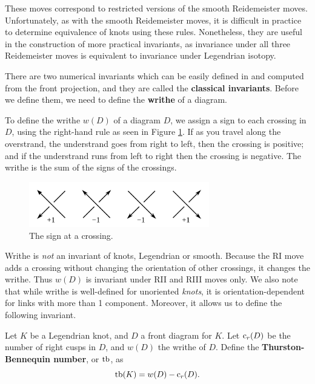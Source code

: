 These moves correspond to restricted versions of the smooth Reidemeister moves.
Unfortunately, as with the smooth Reidemeister moves, it is difficult in practice to determine equivalence of knots using these rules. Nonetheless, they are useful in the construction of more practical invariants, as invariance under all three Reidemeister moves is equivalent to invariance under Legendrian isotopy.


There are two numerical invariants which can be easily defined in and computed from the front projection, and they are called the \textbf{classical invariants}. Before we define them, we need to define the \textbf{writhe} of a diagram.

To define the writhe $w(D)$ of a diagram $D$, we assign a sign to each crossing in $D$, using the right-hand rule as seen in Figure \ref{fig:writhe}. If as you travel along the overstrand, the understrand goes from right to left, then the crossing is positive; and if the understrand runs from left to right then the crossing is negative. 
The writhe is the sum of the signs of the crossings.

\begin{figure}[ht]
    \centering
    \includegraphics[width=0.7\textwidth]{images/writhe.pdf}
    \caption{The sign at a crossing.}
    \label{fig:writhe}
\end{figure}

Writhe is \emph{not} an invariant of knots, Legendrian or smooth. Because the RI move adds a crossing without changing the orientation of other crossings, it changes the writhe. Thus $w(D)$ is invariant under RII and RIII moves only. We also note that while writhe is well-defined for unoriented \emph{knots}, it is orientation-dependent for links with more than 1 component. Moreover, it allows us to define the following invariant.

\begin{definition}
    Let $K$ be a Legendrian knot, and $D$ a front diagram for $K$. Let $\operatorname{c}_r(D)$ be the number of right cusps in $D$, and $w(D)$ the writhe of $D$.
    Define the \textbf{Thurston-Bennequin number}, or $\operatorname{tb}$, as
    \[
        \operatorname{tb}(K) = w(D) - \operatorname{c}_r(D).
    \]
\end{definition}

